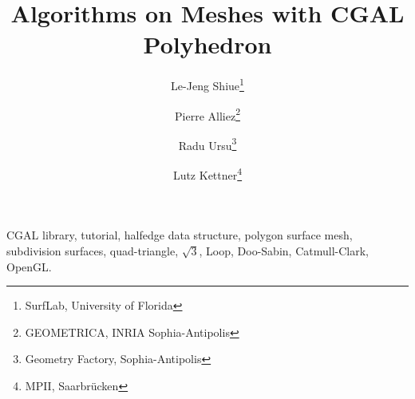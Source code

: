 \documentclass[letter,twoside,10pt]{article}
\begin{document}
\date{}
\title{{\LARGE {\sffamily\bfseries Algorithms on Meshes with CGAL Polyhedron}}}

\author{\small
\sffamily Le-Jeng Shiue\footnote{SurfLab, University of Florida}
\and \small
\sffamily Pierre Alliez\footnote{GEOMETRICA, INRIA Sophia-Antipolis}
\and \small
\sffamily Radu Ursu\footnote{Geometry Factory, Sophia-Antipolis}
\and \small
\sffamily Lutz Kettner\footnote{MPII, Saarbr\"ucken}}
\maketitle

\thispagestyle{empty}

\abstract{
}

\vskip 3mm

                 CGAL library,
                 tutorial,
                 halfedge data structure, 
                 polygon surface mesh,
                 subdivision surfaces,
                 quad-triangle,
                 $\sqrt{3}$,
                 Loop,
                 Doo-Sabin,
                 Catmull-Clark,
                 OpenGL.
\end{document}
